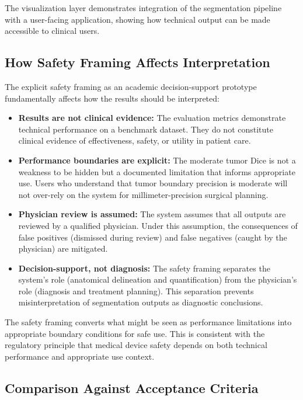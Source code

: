 The visualization layer demonstrates integration of the segmentation pipeline with a user-facing application, showing how technical output can be made accessible to clinical users.

\subsection{How Safety Framing Affects Interpretation}

The explicit safety framing as an academic decision-support prototype fundamentally affects how the results should be interpreted:

\begin{itemize}
    \item \textbf{Results are not clinical evidence:} The evaluation metrics demonstrate technical performance on a benchmark dataset. They do not constitute clinical evidence of effectiveness, safety, or utility in patient care.
    \item \textbf{Performance boundaries are explicit:} The moderate tumor Dice is not a weakness to be hidden but a documented limitation that informs appropriate use. Users who understand that tumor boundary precision is moderate will not over-rely on the system for millimeter-precision surgical planning.
    \item \textbf{Physician review is assumed:} The system assumes that all outputs are reviewed by a qualified physician. Under this assumption, the consequences of false positives (dismissed during review) and false negatives (caught by the physician) are mitigated.
    \item \textbf{Decision-support, not diagnosis:} The safety framing separates the system's role (anatomical delineation and quantification) from the physician's role (diagnosis and treatment planning). This separation prevents misinterpretation of segmentation outputs as diagnostic conclusions.
\end{itemize}

The safety framing converts what might be seen as performance limitations into appropriate boundary conditions for safe use. This is consistent with the regulatory principle that medical device safety depends on both technical performance and appropriate use context.

\subsection{Comparison Against Acceptance Criteria}

